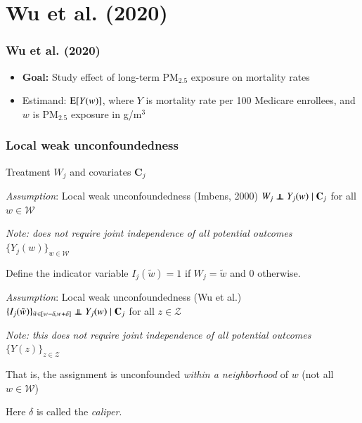 
\section{Wu et al. (2020)}


\begin{frame}
  \frametitle{Wu et al. (2020)}
  
  \begin{itemize}
  \item \textbf{Goal:} Study effect of long-term PM$_\text{2.5}$
    exposure on mortality rates \medskip 
  \item Estimand: $\mathrm{E}[Y(w)]$, where $Y$ is mortality rate per 100
    Medicare enrollees, and $w$ is PM$_\text{2.5}$ exposure in
    {\textmu}g/m$^\text{3}$
  \end{itemize}
  
\end{frame}


\begin{frame}
  \frametitle{Local weak unconfoundedness}

  Treatment $W_j$ and covariates $\mathbf{C}_j$ \medskip 
  

    \begin{block}{\textit{Assumption}: Local weak unconfoundedness (Imbens, 2000)}
      $W_j \ind Y_j(w) \mid \mathbf{C}_j$ for all $w \in \mathcal{W}$ \smallskip

    \footnotesize \emph{Note: does not require joint independence of all
      potential outcomes $\{Y_j(w)\}_{w\in \mathcal{W}}$} \normalsize
  \end{block}

  Define the indicator variable $I_j(\tilde w) = 1$ if
  $W_j = \tilde w$ and $0$ otherwise.
  \begin{block}{\textit{Assumption}: Local weak unconfoundedness (Wu et al.)}
    $\{I_j(\tilde w)\}_{\tilde w \in [w-\delta, w+\delta]} \ind Y_j(w)
    \mid \mathbf{C}_j$ for all $z \in \mathcal{Z}$ \smallskip

    \footnotesize \emph{Note: this does not require joint independence of all
      potential outcomes $\{Y(z)\}_{z\in \mathcal{Z}}$} \normalsize
  \end{block}
  That is, the assignment is unconfounded \emph{within a neighborhood}
  of $w$ (not all $w \in \mathcal{W}$)

  \medskip Here $\delta$ is called the \textit{caliper}. 
  
\end{frame}

